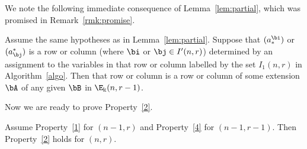 We note the following immediate consequence of Lemma~\ref{lem:partial}, which was promised in Remark~\ref{rmk:promise}.

\begin{coro}\label{cor:colouring}
Assume the same hypotheses as in Lemma~\ref{lem:partial}. Suppose that
$(a^\bi_*)$ or $(a^*_\bj)$ is a row or column \textup{(}where $\bi$ or
$\bj \in I'(n,r)$\textup{)} determined by an assignment to the
variables in that row or column labelled by the set $I_1(n,r)$ in
Algorithm~\ref{algo}. Then that row or column is a row or column of
some extension $\bA$ of any given $\bB$ in $\E_\Bbbk(n,r-1)$.
\end{coro}

Now we are ready to prove Property~\ref{2}. 

\begin{prop}\label{prop:decomp}
Assume Property~\ref{1} for $(n-1,r)$ and Property~\ref{4} for
$(n-1,r-1)$. Then Property~\ref{2} holds for $(n,r)$.
\end{prop}


